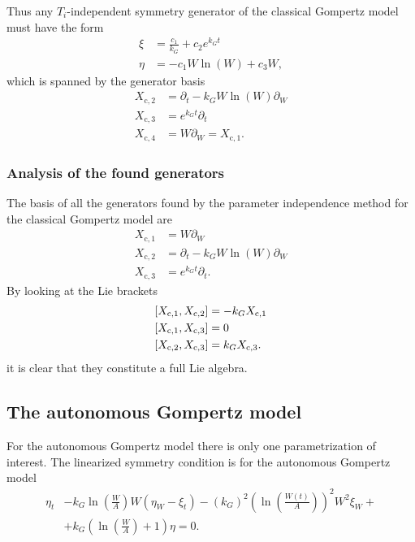Thus any \(T_i\)-independent symmetry generator of the classical Gompertz model  must have the form
\begin{align}
  \xi &= \frac{c_1}{k_G} + c_2 e^{k_G t} \\
  \eta &= -c_1 W \ln(W) + c_3 W,
\end{align}
which is spanned by the generator basis
\begin{align}
  X_{\text{c},2} &= \partial_t - k_G W \ln(W) \partial_W \\
  X_{\text{c},3} &= e^{k_G t} \partial_t \\
  X_{\text{c},4} &= W \partial_W = X_{\text{c},1}.
\end{align}

\subsubsection{Analysis of the found generators}
The basis of all the generators found by the parameter independence method for the classical Gompertz model are
\begin{align}
  X_{\text{c},1} &= W \partial_W \\
  X_{\text{c},2} &= \partial_t - k_G W \ln(W) \partial_W \\
  X_{\text{c},3} &= e^{k_G t} \partial_t.
\end{align}
By looking at the Lie brackets
\begin{align}
  \comm{X_{\text{c},1}}{X_{\text{c},2}} &= -k_G X_{\text{c},1} \\
  \comm{X_{\text{c},1}}{X_{\text{c},3}} &= 0 \\
  \comm{X_{\text{c},2}}{X_{\text{c},3}} &= k_G X_{\text{c},3}.
\end{align}
it is clear that they constitute a full Lie algebra.


\subsection{The autonomous Gompertz model}

For the autonomous Gompertz model there is only one parametrization of interest.
The linearized symmetry condition  is for the autonomous Gompertz model
\begin{equation}\label{eq:gompertz-autonomous-lin-symmetry-cond}
  \begin{split}
    \eta_t &- k_G \ln(\frac{W}{A}) W\left(\eta_W - \xi_t\right) - (k_G)^2 \left(\ln(\frac{W(t)}{A})\right)^2 W^2 \xi_W +\\ &+ k_G \left(\ln(\frac{W}{A}) + 1\right) \eta = 0.
  \end{split}
\end{equation}


